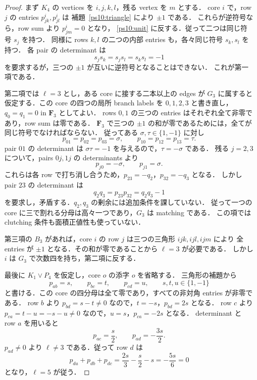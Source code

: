 \begin{proof}
まず $K_4$ の vertices を $i,j,k,l$，残る vertex を $m$ とする．
core $i$ で，row $j$ の entries $p^i_{jk},p^i_{jl}$ は
補題~\ref{ps10:triangle} により $\pm1$ である．
これらが逆符号なら，row sum より $p^i_{jm}=0$ となり，
\eqref{ps10:unit} に反する．従って二つは同じ符号 $s_j$ を持つ．
同様に rows $k,l$ の二つの内部 entries も，各々同じ符号 $s_k,s_l$ を持つ．
各 pair の determinant は
\[
 s_js_k=s_js_l=s_ks_l=-1
\]
を要求するが，三つの $\pm1$ が互いに逆符号となることはできない．
これが第一項である．

第二項では $\ell=3$ とし，ある core に接する二本以上の edges が
$G_3$ に属すると仮定する．この core の四つの局所 branch labels を
$0,1,2,3$ と書き直し，$q_0=q_1=0$ in $\mathbf F_3$ としてよい．
rows $0,1$ の三つの entries はそれぞれ全て非零であり，row sum は零である．
$\mathbf F_3$ で三つの $\pm1$ の和が零であるためには，全てが同じ符号でなければならない．
従ってある $\sigma,\tau\in\{1,-1\}$ に対し
\[
 p_{01}=p_{02}=p_{03}=\sigma,
 \qquad p_{10}=p_{12}=p_{13}=\tau.
\]
pair $01$ の determinant は $\sigma\tau=-1$ を与えるので，$\tau=-\sigma$ である．
残る $j=2,3$ について，pairs $0j,1j$ の determinants より
\[
 p_{j0}=-\sigma,\qquad p_{j1}=\sigma.
\]
これらは各 row で打ち消し合うため，$p_{23}=-q_2$，$p_{32}=-q_3$ となる．
しかし pair $23$ の determinant は
\[
 q_2q_3=p_{23}p_{32}=q_2q_3-1
\]
を要求し，矛盾する．$q_2,q_3$ の剰余には追加条件を課していない．
従って一つの core に三で割れる分母は高々一つであり，$G_3$ は matching である．
この項では clutching 条件も面積正値性も使っていない．

第三項の $B_3$ があれば，core $i$ の row $j$ は三つの三角形 $ijk,ijl,ijm$ により
全 entries が $\pm1$ となる．その和が零であることから $\ell=3$ が必要である．
しかし $i$ は $G_3$ で次数四を持ち，第二項に反する．

最後に $K_1\vee P_4$ を仮定し，core $o$ の添字 $o$ を省略する．
三角形の補題から
\[
 p_{ab}=s,\qquad p_{bc}=t,\qquad p_{cd}=u,
 \qquad s,t,u\in\{1,-1\}
\]
と書ける．この core の四分母は全て零であり，すべての非対角 entries が非零である．
row $b$ より $p_{bd}=s-t\ne0$ なので，$t=-s$，$p_{bd}=2s$ となる．
row $c$ より $p_{ca}=t-u=-s-u\ne0$ なので，$u=s$，$p_{ca}=-2s$ となる．
determinant と row $a$ を用いると
\[
 p_{ac}=\frac{s}{2},\qquad p_{ad}=-\frac{3s}{2}.
\]
$p_{ad}\ne0$ より $\ell\ne3$ である．従って row $d$ は
\[
 p_{da}+p_{db}+p_{dc}
   =\frac{2s}{3}-\frac{s}{2}-s
   =-\frac{5s}{6}=0
\]
となり，$\ell=5$ が従う．
\end{proof}

